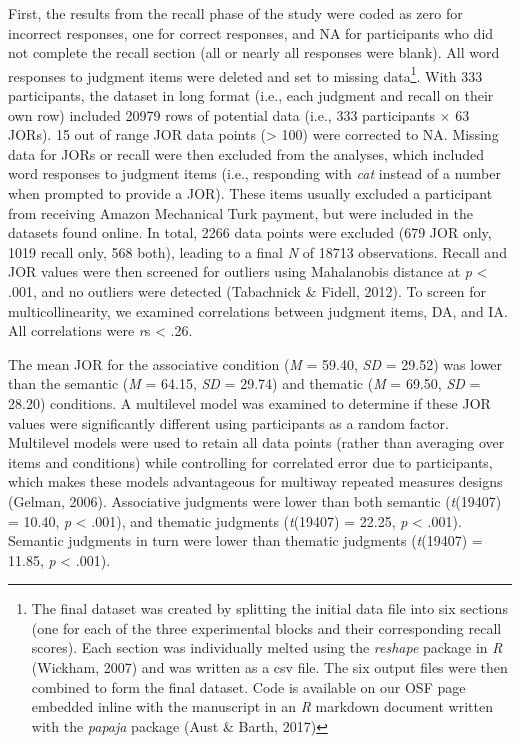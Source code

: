 \documentclass[english,,man]{apa6}
\let\rmarkdownfootnote\footnote%
\def\footnote{\protect\rmarkdownfootnote}
\begin{document}
First, the results from the recall phase of the study were coded as zero for incorrect responses, one for correct responses, and NA for participants who did not complete the recall section (all or nearly all responses were blank). All word responses to judgment items were deleted and set to missing data\footnote{The final dataset was created by splitting the initial data file into six sections (one for each of the three experimental blocks and their corresponding recall scores). Each section was individually melted using the \emph{reshape} package in \emph{R} (Wickham, 2007) and was written as a csv file. The six output files were then combined to form the final dataset. Code is available on our OSF page embedded inline with the manuscript in an \emph{R} markdown document written with the \emph{papaja} package (Aust \& Barth, 2017)}. With 333 participants, the dataset in long format (i.e., each judgment and recall on their own row) included 20979 rows of potential data (i.e., 333 participants \(\times\) 63 JORs). 15 out of range JOR data points (\textgreater{} 100) were corrected to NA. Missing data for JORs or recall were then excluded from the analyses, which included word responses to judgment items (i.e., responding with \emph{cat} instead of a number when prompted to provide a JOR). These items usually excluded a participant from receiving Amazon Mechanical Turk payment, but were included in the datasets found online. In total, 2266 data points were excluded (679 JOR only, 1019 recall only, 568 both), leading to a final \emph{N} of 18713 observations. Recall and JOR values were then screened for outliers using Mahalanobis distance at \emph{p} \textless{} .001, and no outliers were detected (Tabachnick \& Fidell, 2012). To screen for multicollinearity, we examined correlations between judgment items, DA, and IA. All correlations were \emph{r}s \textless{} .26.

The mean JOR for the associative condition (\emph{M} = 59.40, \emph{SD} = 29.52) was lower than the semantic (\emph{M} = 64.15, \emph{SD} = 29.74) and thematic (\emph{M} = 69.50, \emph{SD} = 28.20) conditions. A multilevel model was examined to determine if these JOR values were significantly different using participants as a random factor. Multilevel models were used to retain all data points (rather than averaging over items and conditions) while controlling for correlated error due to participants, which makes these models advantageous for multiway repeated measures designs (Gelman, 2006). Associative judgments were lower than both semantic (\emph{t}(19407) = 10.40, \emph{p} \textless{} .001), and thematic judgments (\emph{t}(19407) = 22.25, \emph{p} \textless{} .001). Semantic judgments in turn were lower than thematic judgments (\emph{t}(19407) = 11.85, \emph{p} \textless{} .001).
\end{document}

